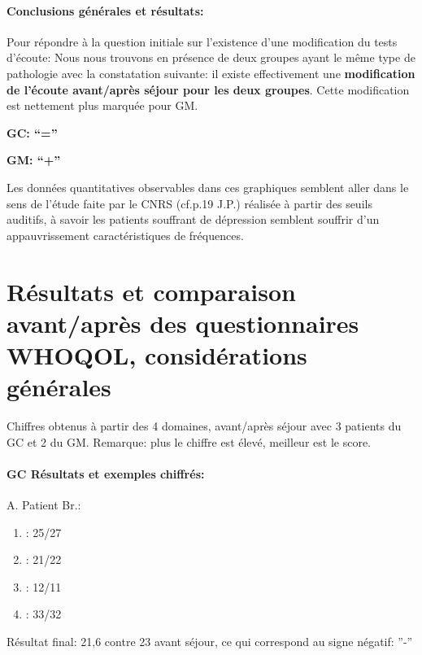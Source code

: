 \paragraph{ Conclusions générales et résultats:}

             Pour répondre à la question initiale sur l'existence d'une modification du tests d'écoute: Nous nous trouvons
           en présence de deux groupes ayant le même type de
           pathologie avec la constatation suivante: il existe effectivement
          une \textbf{modification de l'écoute avant/après séjour pour les
          deux groupes}.
          Cette modification est nettement plus marquée
          pour GM.
         
          \textbf{GC:  ``=''}

          \textbf{GM: ``+''}

          
          
Les données quantitatives observables dans ces graphiques semblent aller dans le
sens de  l'étude faite par le
CNRS (cf.p.19 J.P.) réalisée à partir des seuils auditifs, à savoir
les patients souffrant de dépression semblent souffrir d'un
appauvrissement caractéristiques de fréquences.


\section{Résultats et comparaison avant/après des questionnaires WHOQOL,
  considérations générales}

Chiffres obtenus à partir des 4
domaines, avant/après séjour avec 3 patients du GC et 2 du GM.
Remarque: plus le chiffre est élevé, meilleur est le score.
\paragraph{ GC Résultats et exemples chiffrés:}



A. Patient Br.:

	\begin{enumerate}
 		\item : 25/27 
 		\item : 21/22
 		\item : 12/11
 		\item : 33/32
                \end{enumerate}
                
        Résultat final: 21,6 contre 23 avant séjour,  ce qui
        correspond au signe négatif: ''-''

